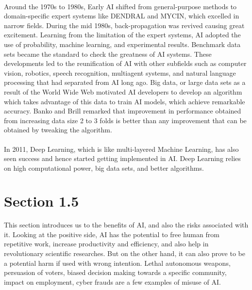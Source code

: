 \documentclass{article}
\begin{document}
\paragraph{}
  Around the 1970s to 1980s, Early AI shifted from general-purpose methods to domain-specific expert systems like DENDRAL and MYCIN, which excelled in narrow fields. 
  During the mid 1980s, back-propagation was revived causing great excitement. 
  Learning from the limitation of the expert systems, AI adopted the use of probability, machine learning, and experimental results. 
  Benchmark data sets became the standard to check the greatness of AI systems. 
  These developments led to the reunification of AI with other subfields such as computer vision, robotics, speech recognition, multiagent systems, and natural language processing that had separated from AI long ago. 
  Big data, or large data sets as a result of the World Wide Web motivated AI developers to develop an algorithm which takes advantage of this data to train AI models, which achieve remarkable accuracy. 
  Banko and Brill remarked that improvement in performance obtained from increasing data size 2 to 3 folds is better than any improvement that can be obtained by tweaking the algorithm. 

\paragraph{}
  In 2011, Deep Learning, which is like multi-layered Machine Learning, has also seen success and hence started getting implemented in AI. 
  Deep Learning relies on high computational power, big data sets, and better algorithms.



\section{Section 1.5}

\paragraph{}
  This section introduces us to the benefits of AI, and also the risks associated with it.
  Looking at the positive side, AI has the potential to free human from repetitive work, increase productivity and efficiency, and also help in revolutionary scientific researches. 
  But on the other hand, it can also prove to be a potential harm if used with wrong intention.
  Lethal autonomous weapons, persuasion of voters, biased decision making towards a specific community, impact on employment, cyber frauds are a few examples of misuse of AI.
\end{document}
